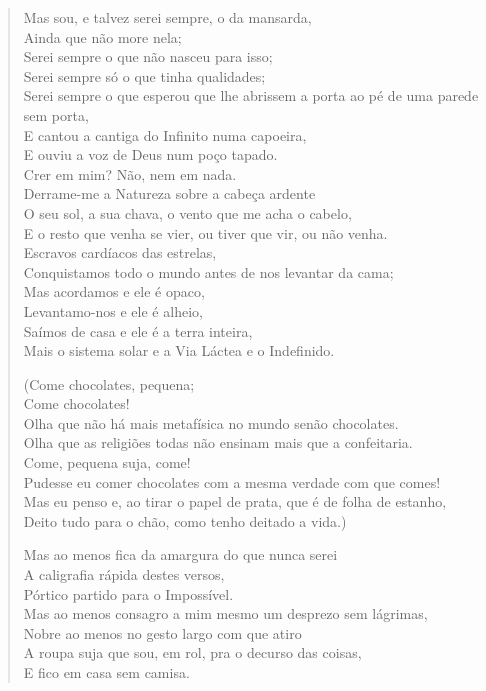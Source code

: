 \documentclass[10pt,a5paper,oneside]{book}
\begin{document}
\begin{verse}
Mas sou, e talvez serei sempre, o da mansarda,\\
Ainda que não more nela;\\
Serei sempre o que não nasceu para isso;\\
Serei sempre só o que tinha qualidades;\\
Serei sempre o que esperou que lhe abrissem a porta ao pé de uma parede sem porta,\\
E cantou a cantiga do Infinito numa capoeira,\\
E ouviu a voz de Deus num poço tapado.\\
Crer em mim? Não, nem em nada.\\
Derrame-me a Natureza sobre a cabeça ardente\\
O seu sol, a sua chava, o vento que me acha o cabelo,\\
E o resto que venha se vier, ou tiver que vir, ou não venha.\\
Escravos cardíacos das estrelas,\\
Conquistamos todo o mundo antes de nos levantar da cama;\\
Mas acordamos e ele é opaco,\\
Levantamo-nos e ele é alheio,\\
Saímos de casa e ele é a terra inteira,\\
Mais o sistema solar e a Via Láctea e o Indefinido.

(Come chocolates, pequena;\\
Come chocolates!\\
Olha que não há mais metafísica no mundo senão chocolates.\\
Olha que as religiões todas não ensinam mais que a confeitaria.\\
Come, pequena suja, come!\\
Pudesse eu comer chocolates com a mesma verdade com que comes!\\
Mas eu penso e, ao tirar o papel de prata, que é de folha de estanho,\\
Deito tudo para o chão, como tenho deitado a vida.)

Mas ao menos fica da amargura do que nunca serei\\
A caligrafia rápida destes versos,\\
Pórtico partido para o Impossível.\\
Mas ao menos consagro a mim mesmo um desprezo sem lágrimas,\\
Nobre ao menos no gesto largo com que atiro\\
A roupa suja que sou, em rol, pra o decurso das coisas,\\
E fico em casa sem camisa.


\end{verse}
\end{document}
